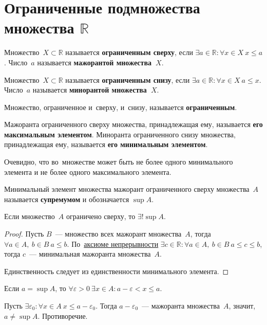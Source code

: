\section{Ограниченные подмножества множества \texorpdfstring{$\mathbb R$}{}}
 Множество~$X \subset \mathbb R$ называется \textbf{ограниченным сверху}, если $\exists a \in \mathbb R \colon \forall x \in X \ x \leqslant a$.
Число~$a$ называется \textbf{мажорантой множества~$X$}.

 Множество~$X \subset \mathbb R$ называется \textbf{ограниченным снизу}, если $\exists a \in \mathbb R \colon \forall x \in X \ a \leqslant x$.
Число~$a$ называется \textbf{минорантой множества~$X$}.

Множество, ограниченное и~сверху, и~снизу, называется \textbf{ограниченным}.

Мажоранта ограниченного сверху множества, принадлежащая ему, называется \textbf{его максимальным элементом}.
Миноранта ограниченного снизу множества, принадлежащая ему, называется \textbf{его минимальным элементом}.

Очевидно, что во~множестве может быть не более одного минимального элемента и не более одного максимального элемента.

 Минимальный элемент множества мажорант ограниченного сверху множества~$A$ называется \textbf{супремумом} и обозначается $\sup A$.

\begin{statement}
\label{st:single_supremum}
Если множество~$A$ ограничено сверху, то $\exists! \sup A$.
\end{statement}
\begin{proof}
Пусть $B$~--- множество всех мажорант множества~$A$, тогда $\forall a \in A, \ b \in B \ a \leqslant b$.
По~\hyperlink{eq:continuity_axiom}{аксиоме непрерывности} $\exists c \in \mathbb R \colon \forall a \in A, \ b \in B \ a \leqslant c \leqslant b$, тогда $c$~--- минимальная мажоранта множества~$A$.

Единственность следует из единственности минимального элемента.
\end{proof}

\begin{statement}
\label{st:inequality_of_supremum}
Если $a = \sup A$, то
$\forall \varepsilon > 0 \ \exists x \in A \colon a - \varepsilon < x \leqslant a$.
\end{statement}
\begin{proofcontra}
Пусть $\exists \varepsilon_0 \colon \forall x \in A \ x \leqslant a - \varepsilon_0$.
Тогда $a - \varepsilon_0$~--- мажоранта множества~$A$, значит, $a \neq \sup A$.
Противоречие.
\end{proofcontra}

